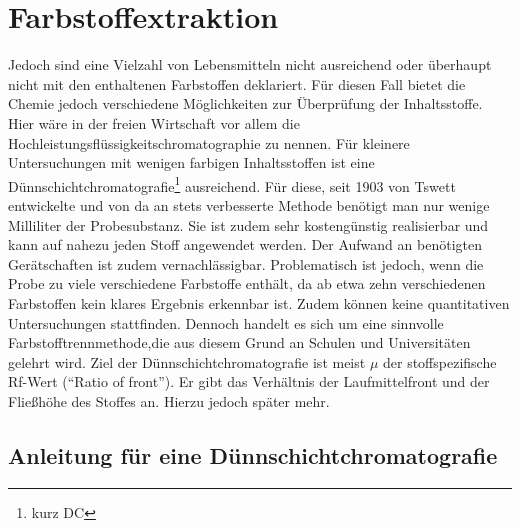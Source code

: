 \documentclass[11pt]{scrreprt}
\begin{document}
\chapter{Farbstoffextraktion}
Jedoch sind eine Vielzahl von Lebensmitteln nicht ausreichend oder überhaupt nicht mit den enthaltenen Farbstoffen deklariert. Für diesen Fall bietet die Chemie jedoch verschiedene Möglichkeiten zur Überprüfung der Inhaltsstoffe. Hier wäre in der freien Wirtschaft vor allem die Hochleistungsflüssigkeitschromatographie zu nennen. Für kleinere Untersuchungen mit wenigen farbigen Inhaltsstoffen ist eine Dünnschichtchromatografie\footnote{kurz DC} ausreichend. Für diese, seit 1903 von Tswett entwickelte und von da an stets verbesserte Methode benötigt man nur wenige Milliliter der Probesubstanz. Sie ist zudem sehr kostengünstig realisierbar und kann auf nahezu jeden Stoff angewendet werden. Der Aufwand an benötigten Gerätschaften ist zudem vernachlässigbar. Problematisch ist jedoch, wenn die Probe zu viele verschiedene Farbstoffe enthält, da ab etwa zehn verschiedenen Farbstoffen kein klares Ergebnis erkennbar ist. Zudem können keine quantitativen Untersuchungen stattfinden. Dennoch handelt es sich um eine sinnvolle Farbstofftrennmethode,die aus diesem Grund  an Schulen und Universitäten gelehrt wird. Ziel der Dünnschichtchromatografie ist meist $\mu$ der stoffspezifische Rf-Wert (\enquote{Ratio of front}).  Er gibt das Verhältnis der Laufmittelfront und der Fließhöhe des Stoffes an. Hierzu jedoch später mehr\parencite[S.117-123]{Wittke.1992}.

 \section{ Anleitung für eine  Dünnschichtchromatografie} 
 
\end{document}
